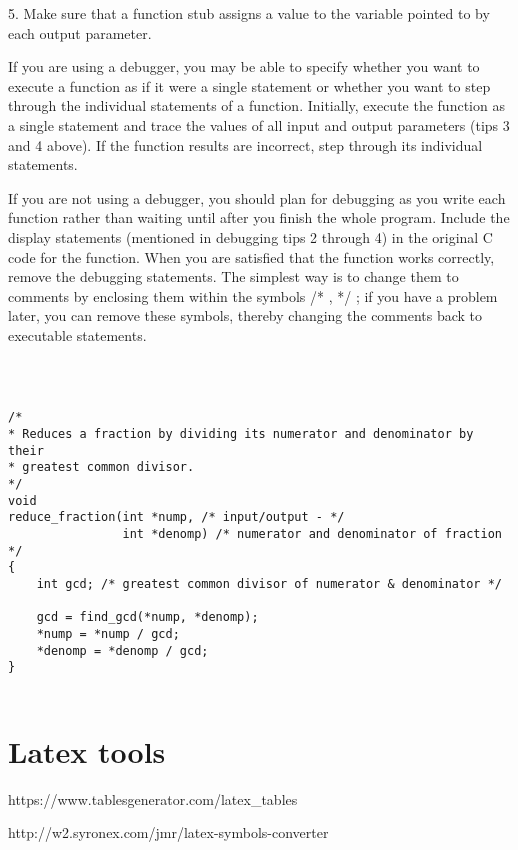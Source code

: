 \documentclass{extarticle}
\begin{document}
\begin{multicols}{4}
5. Make sure that a function stub assigns a value to the variable pointed to by each output parameter.



If you are using a debugger, you may be able to specify whether you want to execute a function as if it were a single statement or whether you want to step through the individual statements of a function. Initially, execute the function as a single statement and trace the values of all input and output parameters (tips 3 and 4 above). If the function results are incorrect, step through its individual statements.

If you are not using a debugger, you should plan for debugging as you write each function rather than waiting until after you finish the whole program. Include the display statements (mentioned in debugging tips 2 through 4) in the original C code for the function. When you are satisfied that the function works correctly, remove the debugging statements. The simplest way is to change them to comments by enclosing them within the symbols /* , */ ; if you have a problem later, you can remove these symbols, thereby changing the comments back to executable statements.








\begin{verbatim}



/*
* Reduces a fraction by dividing its numerator and denominator by their
* greatest common divisor.
*/
void
reduce_fraction(int *nump, /* input/output - */
                int *denomp) /* numerator and denominator of fraction */
{
    int gcd; /* greatest common divisor of numerator & denominator */

    gcd = find_gcd(*nump, *denomp);
    *nump = *nump / gcd;
    *denomp = *denomp / gcd;
}


\end{verbatim}










\section{Latex tools}

https://www.tablesgenerator.com/latex\_tables

http://w2.syronex.com/jmr/latex-symbols-converter


\end{multicols}
\end{document}
